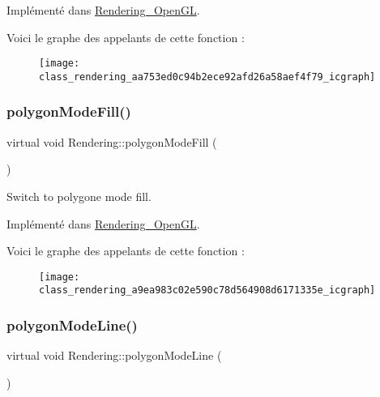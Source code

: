 Implémenté dans \hyperlink{class_rendering___open_g_l_aee7a6085edb4e6927282067b6cde59bf}{Rendering\+\_\+\+Open\+GL}.

Voici le graphe des appelants de cette fonction \+:\nopagebreak
\begin{figure}[H]
\begin{center}
\leavevmode
\texttt{[image: class\_rendering\_aa753ed0c94b2ece92afd26a58aef4f79\_icgraph]}
\end{center}
\end{figure}
\mbox{\label{class_rendering_a9ea983c02e590c78d564908d6171335e}} 
\subsubsection{\texorpdfstring{polygon\+Mode\+Fill()}{polygonModeFill()}}
{\footnotesize\ttfamily virtual void Rendering\+::polygon\+Mode\+Fill (\begin{DoxyParamCaption}{ }\end{DoxyParamCaption})\hspace{0.3cm}{\ttfamily [pure virtual]}}



Switch to polygone mode fill. 



Implémenté dans \hyperlink{class_rendering___open_g_l_a4e3a8195e4249bf0d7c8b33400611399}{Rendering\+\_\+\+Open\+GL}.

Voici le graphe des appelants de cette fonction \+:\nopagebreak
\begin{figure}[H]
\begin{center}
\leavevmode
\texttt{[image: class\_rendering\_a9ea983c02e590c78d564908d6171335e\_icgraph]}
\end{center}
\end{figure}
\mbox{\label{class_rendering_aeb3922ecc539c6d8e9339fb3760cd560}} 
\subsubsection{\texorpdfstring{polygon\+Mode\+Line()}{polygonModeLine()}}
{\footnotesize\ttfamily virtual void Rendering\+::polygon\+Mode\+Line (\begin{DoxyParamCaption}{ }\end{DoxyParamCaption})\hspace{0.3cm}{\ttfamily [pure virtual]}}



